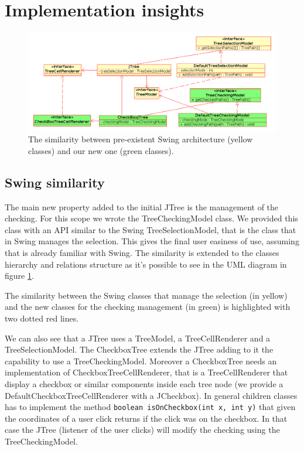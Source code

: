 \documentclass[twocolumn,desyfonts,twoside]{desypaper}  %
\def\CJT{CheckboxTree}
\newcommand{\bc}{\begin{center}}
\newcommand{\ec}{\end{center}}
\begin{document}
\section{Implementation insights}


\begin{figure}[]
\bc
\includegraphics[angle=0,width=1\textwidth]{dia-small-right.png}
\caption{The similarity between pre-existent Swing architecture
(yellow classes) and our new one (green classes).}
\label{fig.classDiagram} \ec
\end{figure}


\subsection{Swing similarity}
The main new property added to the initial JTree is the management
of the checking. For this scope we wrote the TreeCheckingModel
class. We provided this class with an API similar to the Swing
TreeSelectionModel, that is the class that in Swing manages the
selection. This gives the final user easiness of use, assuming that
is already familiar with Swing. The similarity is extended to the
classes hierarchy and relations structure as it's possible to see in
the UML diagram in figure \ref{fig.classDiagram}.


The similarity between the Swing classes that manage the selection
(in yellow) and the new classes for the checking management (in
green) is highlighted with two dotted red lines.

We can also see that a JTree uses a TreeModel, a TreeCellRenderer
and a TreeSelectionModel. The \CJT{} extends the JTree adding to it
the capability to use a TreeCheckingModel. Moreover a \CJT{} needs
an implementation of CheckboxTreeCellRenderer, that is a
TreeCellRenderer that display a checkbox or similar components
inside each tree node (we provide a DefaultCheckboxTreeCellRenderer
with a JCheckbox). In general children classes has to implement the
method \texttt{boolean isOnCheckbox(int x, int y)} that given the
coordinates of a user click returns if the click was on the
checkbox. In that case the JTree (listener of the user clicks) will
modify the checking using the TreeCheckingModel.
\end{document}
